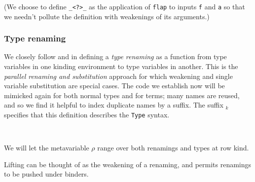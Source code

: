 \documentclass[authoryear, acmsmall, screen, review, nonacm]{acmart}
\begin{document}
\Ni (We choose to define \verb!_<?>_! as the application of \verb!flap! to inputs \verb!f! and \verb!a! so that we needn't pollute the definition with weakenings of its arguments.)


\subsubsection{Type renaming}

We closely follow \citet{plfa22} and \citet{ChapmanKNW19}  in defining a \emph{type renaming} as a function from type variables in one kinding environment to type variables in another. This is the \emph{parallel renaming and substitution} approach for which weakening and single variable substitution are special cases. The code we establish now will be mimicked again for both normal types and for terms; many names are reused, and so we find it helpful to index duplicate names by a suffix. The suffix $_k$ specifies that this definition describes the \verb!Type! syntax.

\begin{code}%
\>[0]\AgdaSpace{}%
\AgdaSymbol{:}\AgdaSpace{}%
\AgdaSpace{}%
\AgdaSpace{}%
\AgdaSpace{}%
\AgdaSpace{}%
\<%
\\
\>[0]\AgdaSpace{}%
\AgdaSpace{}%
\AgdaSpace{}%
\AgdaSymbol{=}\AgdaSpace{}%
\AgdaSpace{}%
\AgdaSymbol{\{}\AgdaSymbol{\}}\AgdaSpace{}%
\AgdaSpace{}%
\AgdaSpace{}%
\AgdaSpace{}%
\AgdaSpace{}%
\AgdaSpace{}%
\AgdaSpace{}%
\AgdaSpace{}%
\<%
\end{code}

\Ni We will let the metavariable $\rho$ range over both renamings and types at row kind.

Lifting can be thought of as the weakening of a renaming, and permits renamings to be pushed under binders.
\end{document}
